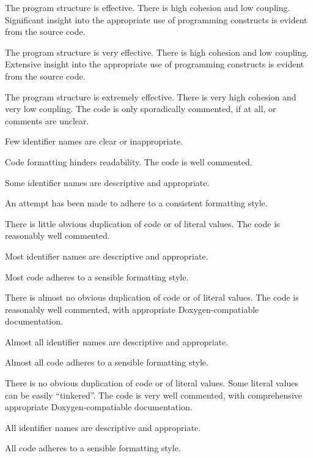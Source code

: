 \documentclass{../../fal_assignment}
\begin{document}
\begin{markingrubric}
            \par The program structure is effective. There is high cohesion and low coupling.
        \grade Significant insight into the appropriate use of programming constructs is evident from the source code.
            \par The program structure is very effective. There is high cohesion and low coupling.
        \grade Extensive insight into the appropriate use of programming constructs is evident from the source code.
            \par The program structure is extremely effective. There is very high cohesion and very low coupling.
%
        \grade \fail The code is only sporadically commented, if at all, or comments are unclear.
            \par Few identifier names are clear or inappropriate.
            \par Code formatting hinders readability.
        \grade The code is well commented.
            \par Some identifier names are descriptive and appropriate.
            \par An attempt has been made to adhere to a consistent formatting style.
             \par There is little obvious duplication of code or of literal values.           
        \grade The code is reasonably well commented.
            \par Most identifier names are descriptive and appropriate.
            \par Most code adheres to a sensible formatting style.
             \par There is almost no obvious duplication of code or of literal values.   
        \grade The code is reasonably well commented, with appropriate Doxygen-compatiable documentation.
            \par Almost all identifier names are descriptive and appropriate.
            \par Almost all code adheres to a sensible formatting style.
             \par There is no obvious duplication of code or of literal values. Some literal values can be easily ``tinkered''. 
        \grade The code is very well commented, with comprehensive appropriate Doxygen-compatiable documentation.
            \par All identifier names are descriptive and appropriate.
            \par All code adheres to a sensible formatting style.

\end{markingrubric}
\end{document}
